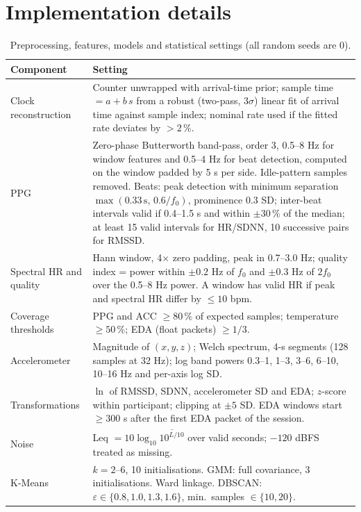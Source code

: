 \documentclass[runningheads]{llncs}
\begin{document}
\section{Implementation details}
\begin{table}[h]
\caption{Preprocessing, features, models and statistical settings (all random seeds are 0).}
\footnotesize\centering
\begin{tabular}{@{}>{\raggedright\arraybackslash}p{2.6cm}>{\raggedright\arraybackslash}p{9.1cm}@{}}
\toprule
Component & Setting\\
\midrule
Clock reconstruction & Counter unwrapped with arrival-time prior; sample time $=a+b\,s$ from a robust (two-pass, $3\sigma$) linear fit of arrival time against sample index; nominal rate used if the fitted rate deviates by $>2\,\%$.\\
PPG & Zero-phase Butterworth band-pass, order 3, 0.5--8 Hz for window features and 0.5--4 Hz for beat detection, computed on the window padded by 5 s per side. Idle-pattern samples removed. Beats: peak detection with minimum separation $\max(0.33\,\mathrm{s},\,0.6/f_0)$, prominence 0.3 SD; inter-beat intervals valid if 0.4--1.5 s and within $\pm30\,\%$ of the median; at least 15 valid intervals for HR/SDNN, 10 successive pairs for RMSSD.\\
Spectral HR and quality & Hann window, 4$\times$ zero padding, peak in 0.7--3.0 Hz; quality index = power within $\pm0.2$ Hz of $f_0$ and $\pm0.3$ Hz of $2f_0$ over the 0.5--8 Hz power. A window has valid HR if peak and spectral HR differ by $\le10$ bpm.\\
Coverage thresholds & PPG and ACC $\ge80\,\%$ of expected samples; temperature $\ge50\,\%$; EDA (float packets) $\ge1/3$.\\
Accelerometer & Magnitude of $(x,y,z)$; Welch spectrum, 4-s segments (128 samples at 32 Hz); log band powers 0.3--1, 1--3, 3--6, 6--10, 10--16 Hz and per-axis log SD.\\
Transformations & $\ln$ of RMSSD, SDNN, accelerometer SD and EDA; $z$-score within participant; clipping at $\pm5$ SD. EDA windows start $\ge300$ s after the first EDA packet of the session.\\
Noise & Leq $=10\log_{10}\overline{10^{L/10}}$ over valid seconds; $-120$ dBFS treated as missing.\\
K-Means & $k=2$--6, 10 initialisations. GMM: full covariance, 3 initialisations. Ward linkage. DBSCAN: $\varepsilon\in\{0.8,1.0,1.3,1.6\}$, min.\ samples $\in\{10,20\}$.\\

\end{tabular}
\end{table}
\end{document}
